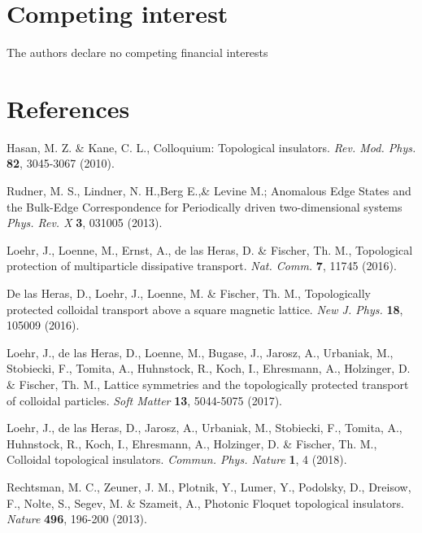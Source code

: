\documentclass[12pt]{iopart}
\begin{document}
\section*{Competing interest }The authors declare no competing financial interests

 
 \emph{}
 \section{References}
\begin{thebibliography}{10}


        
        Hasan, M. Z. \&  Kane, C. L., 
        Colloquium: Topological insulators.
        {\it Rev. Mod. Phys.} {\bf 82}, 3045-3067 (2010).

		Rudner, M. S., Lindner, N. H.,Berg E.,\&  Levine M.; 
		Anomalous Edge States and the Bulk-Edge Correspondence for Periodically driven two-dimensional systems
		{\it Phys. Rev. X} {\bf 3}, 031005 (2013).



 Loehr, J., Loenne, M., Ernst, A., de las Heras, D. \& Fischer, Th. M., 
		Topological protection of multiparticle dissipative transport.
		{\it Nat. Comm.} {\bfseries 7}, 11745 (2016).

		De las Heras,  D., Loehr, J., Loenne, M. \& Fischer, Th. M.,
		Topologically protected colloidal transport above a square magnetic lattice.
		{\it New J. Phys.} {\bfseries 18}, 105009 (2016).

		Loehr, J., de las Heras, D., Loenne, M., Bugase, J., Jarosz, A., Urbaniak, M., Stobiecki, F., 
		Tomita,	A., Huhnstock, R., Koch, I., Ehresmann, A., Holzinger, D. \& Fischer, Th. M.,	 		
		Lattice symmetries and the topologically protected transport of colloidal particles.
		{\it Soft Matter} {\bfseries 13}, 5044-5075 (2017).

		Loehr, J., de las Heras, D., Jarosz, A., Urbaniak, M., Stobiecki, F., 
		Tomita,	A., Huhnstock, R., Koch, I., Ehresmann, A., Holzinger, D. \& Fischer, Th. M.,	 		
		Colloidal topological insulators.
 		{\it Commun. Phys. Nature} {\bfseries 1}, 4 (2018).
 
    Rechtsman, M. C., Zeuner, J. M.,	Plotnik, Y., Lumer, Y.,	Podolsky, D.,
		Dreisow, F., Nolte, S.,	Segev, M. \& Szameit, A.,		
		Photonic Floquet topological insulators.
		{\it Nature} {\bfseries 496}, 196-200 (2013).


\end{thebibliography}
\end{document}
